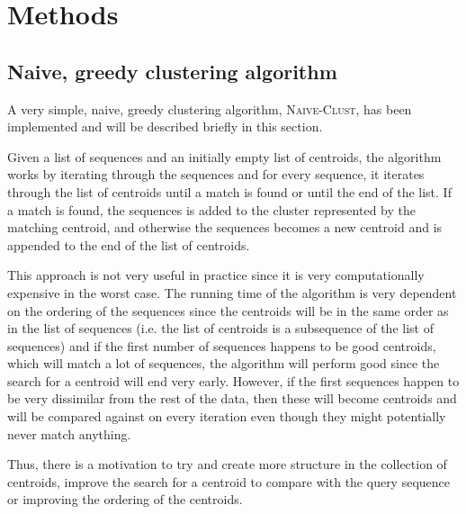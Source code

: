 \section{Methods} \label{sec:methods}





\subsection{Naive, greedy clustering algorithm}

A very simple, naive, greedy clustering algorithm, \textsc{Naive-Clust}, has
been implemented and will be described briefly in this section.

Given a list of sequences and an initially empty list of centroids, the
algorithm works by iterating through the sequences and for every sequence, it
iterates through the list of centroids until a match is found or until the end
of the list. If a match is found, the sequences is added to the cluster
represented by the matching centroid, and otherwise the sequences becomes a new
centroid and is appended to the end of the list of centroids.



This approach is not very useful in practice since it is very computationally
expensive in the worst case. The running time of the algorithm is very dependent
on the ordering of the sequences since the centroids will be in the same order
as in the list of sequences (i.e. the list of centroids is a subsequence of the
list of sequences) and if the first number of sequences happens to be good
centroids, which will match a lot of sequences, the algorithm will perform good
since the search for a centroid will end very early. However, if the first
sequences happen to be very dissimilar from the rest of the data, then these
will become centroids and will be compared against on every iteration even
though they might potentially never match anything.

Thus, there is a motivation to try and create more structure in the collection
of centroids, improve the search for a centroid to compare with the query
sequence or improving the ordering of the centroids.

